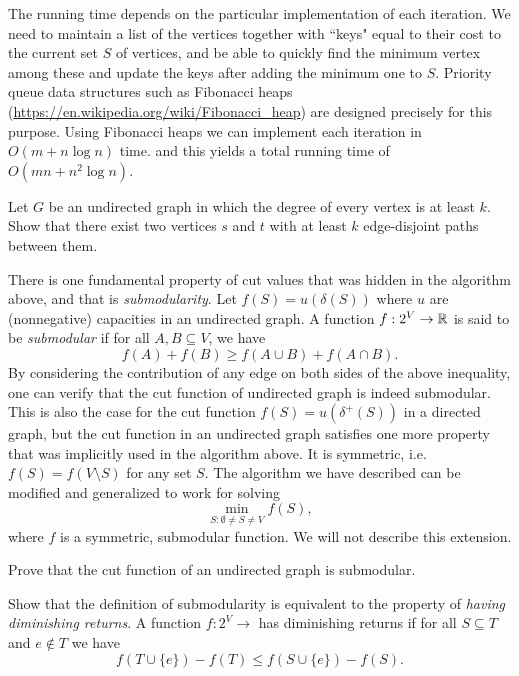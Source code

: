 \documentclass[12pt]{article}
\begin{document}
The running time depends on the particular implementation of each iteration. We need to maintain a list of the vertices together with ``keys" equal to their cost to the current set $S$ of vertices, and be able to quickly find the minimum vertex among these and update the keys after adding the minimum one to $S$. Priority queue data structures such as Fibonacci heaps (\url{https://en.wikipedia.org/wiki/Fibonacci_heap}) are designed precisely for this purpose. Using Fibonacci heaps we can implement each iteration in $O(m+n\log n)$ time. 
and this yields a total running time of $O(mn+n^2\log n)$.

\begin{exercises}
\item
Let $G$ be an undirected graph in which the degree of every vertex is
at least $k$. Show that there exist two vertices $s$ and $t$ with at
least $k$ edge-disjoint paths between them.   
\end{exercises}


There is one fundamental property of cut values that was hidden in the algorithm above, and that is {\it submodularity}. Let $f(S)=u(\delta(S))$ where $u$ are (nonnegative) capacities in an undirected graph. A function $f:2^V \rightarrow {\mathbb R}$ is said to be {\it submodular} if for all $A, B \subseteq V$, we have $$f(A)+f(B) \geq f(A\cup B) + f(A\cap B).$$ By considering the contribution of any edge on both sides of the above inequality, one can verify that the cut function of undirected graph is indeed submodular. This is also the case for the cut function $f(S)=u(\delta^+(S))$ in a directed graph, but the cut function in an undirected graph satisfies one more property that was implicitly used in the algorithm above. It is symmetric, i.e. $f(S)=f(V\setminus S)$ for any set $S$. The algorithm we have described can be modified and generalized to work for solving $$\min_{S: \emptyset \neq S \neq V} f(S),$$ where $f$ is a symmetric, submodular function. We will not describe this extension.   %

\begin{exercises}
	\item Prove that the cut function of an undirected graph is submodular.
	\item Show that the definition of submodularity is equivalent to the property of {\it having diminishing returns}. A function $f: 2^V \rightarrow$ has diminishing returns if for all $S\subseteq T$ and $e\notin T$ we have $$f(T\cup\{e\})-f(T) \leq f(S\cup\{e\})-f(S).$$
\end{exercises}	 
\end{document}
